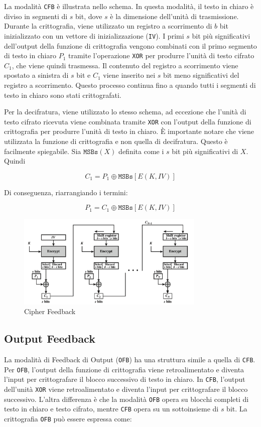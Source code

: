 La modalità \verb|CFB| è illustrata nello schema. In questa modalità, il testo in chiaro
è diviso in segmenti di \(s\) bit, dove \(s\) è la dimensione dell'unità di
trasmissione. Durante la crittografia, viene utilizzato un registro a scorrimento
di \(b\) bit inizializzato con un vettore di inizializzazione (\verb|IV|). I
primi \(s\) bit più significativi dell'output della funzione di crittografia
vengono combinati con il primo segmento di testo in chiaro \(P_1\) tramite
l'operazione \texttt{XOR} per produrre l'unità di testo cifrato \(C_1\), che viene quindi
trasmessa. Il contenuto del registro a scorrimento viene spostato a sinistra di
\(s\) bit e \(C_1\) viene inserito nei \(s\) bit meno significativi del registro
a scorrimento. Questo processo continua fino a quando tutti i segmenti di testo
in chiaro sono stati crittografati.

Per la decifratura, viene utilizzato lo stesso schema, ad eccezione che l'unità
di testo cifrato ricevuta viene combinata tramite \verb|XOR| con l'output della funzione
di crittografia per produrre l'unità di testo in chiaro. È importante notare che
viene utilizzata la funzione di crittografia e non quella di decifratura. Questo
è facilmente spiegabile. Sia \(\texttt{MSBs}(X)\) definita come i \(s\) bit più significativi
di \(X\). Quindi

\[ C_1 = P_1 \oplus \texttt{MSBs}[E(K, IV)] \]

Di conseguenza, riarrangiando i termini:

\[ P_1 = C_1 \oplus \texttt{MSBs}[E(K, IV)] \]
\begin{figure}[H]
    \centering
    \includegraphics[width=0.8\textwidth]{img/cipherFeedback.png}
    \caption{Cipher Feedback}
\end{figure}
\subsection{Output Feedback}
La modalità di Feedback di Output (\verb|OFB|) ha una struttura simile a
quella di \verb|CFB|. Per \verb|OFB|, l'output della funzione di crittografia viene
retroalimentato e diventa l'input per crittografare il blocco successivo
di testo in chiaro. In \verb|CFB|, l'output dell'unità \verb|XOR| viene
retroalimentato e diventa l'input per crittografare il blocco successivo.
L'altra differenza è che la modalità \verb|OFB| opera su blocchi completi
di testo
in chiaro e testo cifrato, mentre \verb|CFB| opera su un sottoinsieme di \(s\) bit.
La crittografia \verb|OFB| può essere espressa come:

